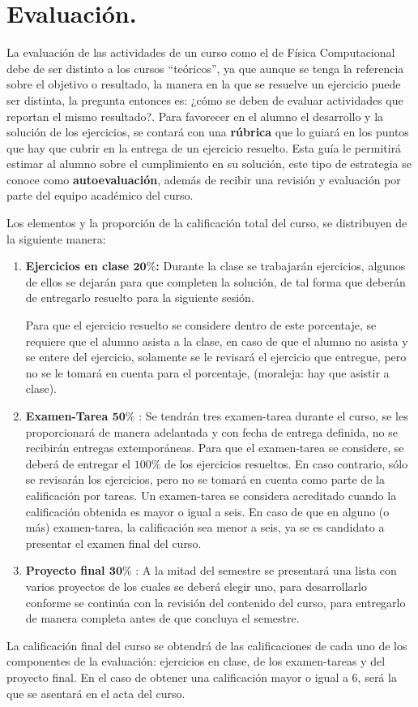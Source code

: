 \section{Evaluación.}

La evaluación de las actividades de un curso como el de Física Computacional debe de ser distinto a los cursos \enquote{teóricos}, ya que aunque se tenga la referencia sobre el objetivo o resultado, la manera en la que se resuelve un ejercicio puede ser distinta, la pregunta entonces es: ¿cómo se deben de evaluar actividades que reportan el mismo resultado?. Para favorecer en el alumno el desarrollo y la solución de los ejercicios, se contará con una \textbf{rúbrica} que lo guiará en los puntos que hay que cubrir en la entrega de un ejercicio resuelto. Esta guía le permitirá estimar al alumno sobre el cumplimiento en su solución, este tipo de estrategia se conoce como \textbf{autoevaluación}, además de recibir una revisión y evaluación por parte del equipo académico del curso.
\par
Los elementos y la proporción de la calificación total del curso, se distribuyen de la siguiente manera:
\begin{enumerate}[label=\alph*)]
\item \textbf{Ejercicios en clase $\mathbf{20\%}$:} Durante la clase se trabajarán ejercicios, algunos de ellos se dejarán para que completen la solución, de tal forma que deberán de entregarlo resuelto para la siguiente sesión.
\par
Para que el ejercicio resuelto se considere dentro de este porcentaje, se requiere que el alumno asista a la clase, en caso de que el alumno no asista y se entere del ejercicio, solamente se le revisará el ejercicio que entregue, pero no se le tomará en cuenta para el porcentaje, (moraleja: hay que asistir a clase).
\item \textbf{Examen-Tarea $\mathbf{50\%}$} : Se tendrán tres examen-tarea durante el curso, se les proporcionará de manera adelantada y con fecha de entrega definida, no se recibirán entregas extemporáneas. Para que el examen-tarea se considere, se deberá de entregar el $100\%$ de los ejercicios resueltos. En caso contrario, sólo se revisarán los ejercicios, pero no se tomará en cuenta como parte de la calificación por tareas. Un examen-tarea se considera acreditado cuando la calificación obtenida es mayor o igual a seis. En caso de que en alguno (o más) examen-tarea, la calificación sea menor a seis, ya se es candidato a presentar el examen final del curso.
\item \textbf{Proyecto final $\mathbf{30\%}$} : A la mitad del semestre se presentará una lista con varios proyectos de los cuales se deberá elegir uno, para desarrollarlo conforme se continúa con la revisión del contenido del curso, para entregarlo de manera completa antes de que concluya el semestre.
\end{enumerate}
La calificación final del curso se obtendrá de las calificaciones de cada uno de los componentes de la evaluación: ejercicios en clase, de los examen-tareas y del proyecto final. En el caso de obtener una calificación mayor o igual a $6$, será la que se asentará en el acta del curso.

